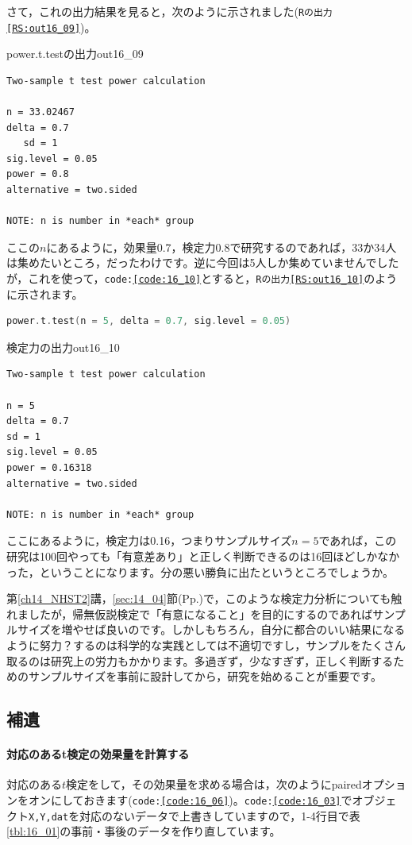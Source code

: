 \documentclass{ltjsbook}
\begin{document}
さて，これの出力結果を見ると，次のように示されました(\texttt{Rの出力\ref{RS:out16_09}})。
\begin{Rscreen}{power.t.testの出力}{out16_09}
	\begin{verbatim}
Two-sample t test power calculation 

n = 33.02467
delta = 0.7
   sd = 1
sig.level = 0.05
power = 0.8
alternative = two.sided

NOTE: n is number in *each* group
\end{verbatim}
\end{Rscreen}
ここの$n$にあるように，効果量0.7，検定力0.8で研究するのであれば，33か34人は集めたいところ，だったわけです。逆に今回は5人しか集めていませんでしたが，これを使って，\texttt{code:\ref{code:16_10}}とすると，\texttt{Rの出力\ref{RS:out16_10}}のように示されます。

\begin{lstlisting}[language=c++,label={code:16_10},caption={power.t.testで$n$を固定}]
power.t.test(n = 5, delta = 0.7, sig.level = 0.05)
\end{lstlisting}

\begin{Rscreen}{検定力の出力}{out16_10}
	\begin{verbatim}
Two-sample t test power calculation 

n = 5
delta = 0.7
sd = 1
sig.level = 0.05
power = 0.16318
alternative = two.sided

NOTE: n is number in *each* group
\end{verbatim}
\end{Rscreen}
ここにあるように，検定力は0.16，つまりサンプルサイズ$n=5$であれば，この研究は100回やっても「有意差あり」と正しく判断できるのは16回ほどしかなかった，ということになります。分の悪い勝負に出たというところでしょうか。

第\ref{ch14_NHST2}講，\ref{sec:14_04}節(Pp.\pageref{sec:14_04})で，このような検定力分析についても触れましたが，帰無仮説検定で「有意になること」を目的にするのであればサンプルサイズを増やせば良いのです。しかしもちろん，自分に都合のいい結果になるように努力？するのは科学的な実践としては不適切ですし，サンプルをたくさん取るのは研究上の労力もかかります。多過ぎず，少なすぎず，正しく判断するためのサンプルサイズを事前に設計してから，研究を始めることが重要です。


\subsection{補遺}
\paragraph{対応のあるt検定の効果量を計算する}対応のある$t$検定をして，その効果量を求める場合は，次のようにpairedオプションをオンにしておきます(\texttt{code:\ref{code:16_06}})。\texttt{code:\ref{code:16_03}}でオブジェクト\texttt{X,Y,dat}を対応のないデータで上書きしていますので，1-4行目で表\ref{tbl:16_01}の事前・事後のデータを作り直しています。
\end{document}
